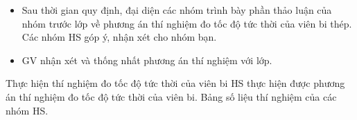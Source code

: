 {\begin{itemize}[label=-]
\begin{itemize}[label=$\bullet$]
\begin{itemize}[label=\checkmark]
				\item MODE A$\leftrightarrow$B: đo khoảng thời gian từ lúc vật chắn công quang điện A đến thời điểm vật chắn cổng quang điện B.			
			\end{itemize}
		\end{itemize}
		\item Sau thời gian quy định, đại diện các nhóm trình bày phần thảo luận của nhóm trước lớp về phương án thí nghiệm đo tốc độ tức thời của viên bi thép. Các nhóm HS góp ý, nhận xét cho nhóm bạn.
		\item GV nhận xét và thống nhất phương án thí nghiệm với lớp.
	\end{itemize}
}
\hoatdong
{Thực hiện thí nghiệm đo tốc độ tức thời của viên bi
}
{HS thực hiện được phương án thí nghiệm đo tốc độ tức thời của viên bi.
}
{Bảng số liệu thí nghiệm của các nhóm HS.
}
